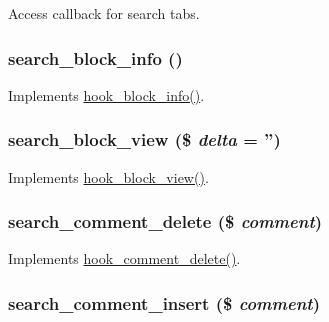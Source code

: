 \label{search_8module_ad23d575da2f572416a56555fe51fc565}
Access callback for search tabs. \hypertarget{search_8module_a2f13d2fc1d549a040d7bdbda511710a0}{
\subsubsection[{search\_\-block\_\-info}]{\setlength{\rightskip}{0pt plus 5cm}search\_\-block\_\-info ()}}
\label{search_8module_a2f13d2fc1d549a040d7bdbda511710a0}
Implements \hyperlink{group__hooks_ga2bd926c3e90deeba0c3ba64fb3c64d73}{hook\_\-block\_\-info()}. \hypertarget{search_8module_a04d7ad10e5af7a7053b386f9b5e70304}{
\subsubsection[{search\_\-block\_\-view}]{\setlength{\rightskip}{0pt plus 5cm}search\_\-block\_\-view (\$ {\em delta} = {\ttfamily ''})}}
\label{search_8module_a04d7ad10e5af7a7053b386f9b5e70304}
Implements \hyperlink{group__hooks_gaa14092a3e74cdc57aa295100cfd6860d}{hook\_\-block\_\-view()}. \hypertarget{search_8module_aafce819db105850b1570206f6dde2797}{
\subsubsection[{search\_\-comment\_\-delete}]{\setlength{\rightskip}{0pt plus 5cm}search\_\-comment\_\-delete (\$ {\em comment})}}
\label{search_8module_aafce819db105850b1570206f6dde2797}
Implements \hyperlink{group__hooks_gab8d94c5665313a2d174628cc219f0395}{hook\_\-comment\_\-delete()}. \hypertarget{search_8module_ade210f9ad2bba0665dfa46416c4b5377}{
\subsubsection[{search\_\-comment\_\-insert}]{\setlength{\rightskip}{0pt plus 5cm}search\_\-comment\_\-insert (\$ {\em comment})}}
